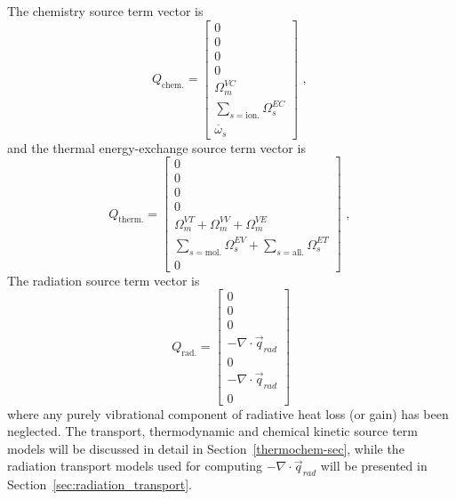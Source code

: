\medskip
The chemistry source term vector is
\begin{equation}
 Q_{\text{chem.}} = \left [ \begin{array}{c} 0 \\ 0 \\ 0 \\ 0 \\ \Omega^{VC}_{m} \\ \sum_{s=\text{ion.}} \Omega^{EC}_{s} \\ \dot{\omega_{s}} \end{array} \right ] \text{ , }
 \label{eq:Q_chem}
\end{equation}
and the thermal energy-exchange source term vector is
\begin{equation}
 Q_{\text{therm.}} = \left [ \begin{array}{c} 0 \\ 0 \\ 0 \\ 0 \\ \Omega^{VT}_{m} + \Omega^{VV}_{m} + \Omega^{VE}_{m} \\ \sum_{s=\text{mol.}}\Omega^{EV}_{s} +  \sum_{s=\text{all.}}\Omega^{ET}_{s} \\ 0 \end{array} \right ] \text{ , }
 \label{eq:Q_therm}
\end{equation}
The radiation source term vector is
\begin{equation}
 Q_{\text{rad.}} = \left [ \begin{array}{c} 0 \\ 0 \\ 0 \\ -\nabla \cdot \vec{q}_{rad} \\ 0 \\ -\nabla \cdot \vec{q}_{rad} \\ 0 \end{array} \right ]
 \label{eq:Q_rad}
\end{equation}
where any purely vibrational component of radiative heat loss (or gain) has been neglected.
The transport, thermodynamic and chemical kinetic source term models 
will be discussed in detail in Section~\ref{thermochem-sec}, while the radiation transport models
used for computing $-\nabla \cdot \vec{q}_{rad}$ will be presented in Section~\ref{sec:radiation_transport}.


